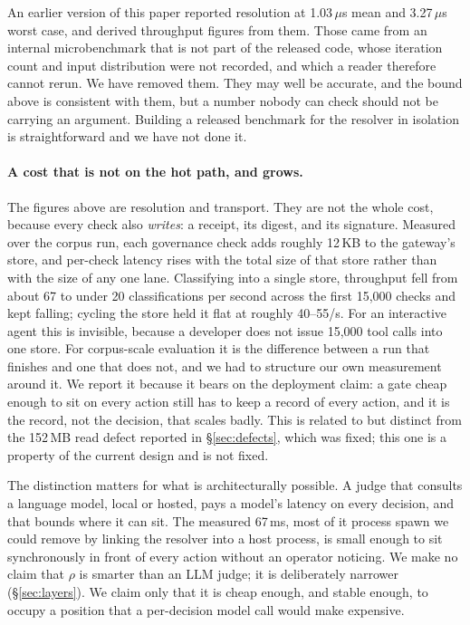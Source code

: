 \documentclass[10pt]{article}
\begin{document}
An earlier version of this paper reported resolution at 1.03\,$\mu$s mean and
3.27\,$\mu$s worst case, and derived throughput figures from them. Those came from an
internal microbenchmark that is not part of the released code, whose iteration count
and input distribution were not recorded, and which a reader therefore cannot rerun.
We have removed them. They may well be accurate, and the bound above is consistent
with them, but a number nobody can check should not be carrying an argument. Building
a released benchmark for the resolver in isolation is straightforward and we have not
done it.

\paragraph{A cost that is not on the hot path, and grows.} The figures above are
resolution and transport. They are not the whole cost, because every check also
\emph{writes}: a receipt, its digest, and its signature. Measured over the corpus run,
each governance check adds roughly 12\,KB to the gateway's store, and per-check
latency rises with the total size of that store rather than with the size of any one
lane. Classifying into a single store, throughput fell from about 67 to under 20
classifications per second across the first 15,000 checks and kept falling; cycling
the store held it flat at roughly 40--55/s. For an interactive agent this is
invisible, because a developer does not issue 15,000 tool calls into one store. For
corpus-scale evaluation it is the difference between a run that finishes and one that
does not, and we had to structure our own measurement around it. We report it because
it bears on the deployment claim: a gate cheap enough to sit on every action still has
to keep a record of every action, and it is the record, not the decision, that scales
badly. This is related to but distinct from the 152\,MB read defect reported in
\S\ref{sec:defects}, which was fixed; this one is a property of the current design and
is not fixed.

The distinction matters for what is architecturally possible. A judge that consults a
language model, local or hosted, pays a model's latency on every decision, and that
bounds where it can sit. The measured 67\,ms, most of it process spawn we could remove
by linking the resolver into a host process, is small enough to sit synchronously in
front of every action without an operator noticing. We make no claim that $\rho$ is
smarter than an LLM judge; it is deliberately narrower (\S\ref{sec:layers}). We claim
only that it is cheap enough, and stable enough, to occupy a position that a
per-decision model call would make expensive.
\end{document}
